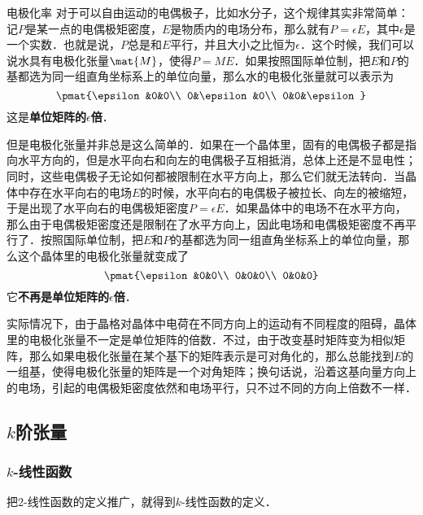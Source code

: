 \begin{example}{电极化率}
对于可以自由运动的电偶极子，比如水分子，这个规律其实非常简单：记${P}$是某一点的电偶极矩密度，${E}$是物质内的电场分布，那么就有${P}=\epsilon{E}$，其中$\epsilon$是一个实数．也就是说，${P}$总是和${E}$平行，并且大小之比恒为$\epsilon$．这个时候，我们可以说水具有电极化张量$\mat{M}$，使得${P}={M}{E}$．如果按照国际单位制，把${E}$和${P}$的基都选为同一组直角坐标系上的单位向量，那么水的电极化张量就可以表示为
\begin{equation}
\pmat{\epsilon&0&0\\ 0&\epsilon&0\\ 0&0&\epsilon}
\end{equation}
这是\textbf{单位矩阵的$\epsilon$倍}．

但是电极化张量并非总是这么简单的．如果在一个晶体里，固有的电偶极子都是指向水平方向的，但是水平向右和向左的电偶极子互相抵消，总体上还是不显电性；同时，这些电偶极子无论如何都被限制在水平方向上，那么它们就无法转向．当晶体中存在水平向右的电场${E}$的时候，水平向右的电偶极子被拉长、向左的被缩短，于是出现了水平向右的电偶极矩密度${P}=\epsilon{E}$．如果晶体中的电场不在水平方向，那么由于电偶极矩密度还是限制在了水平方向上，因此电场和电偶极矩密度不再平行了．按照国际单位制，把${E}$和${P}$的基都选为同一组直角坐标系上的单位向量，那么这个晶体里的电极化张量就变成了
\begin{equation}
\pmat{\epsilon&0&0\\ 0&0&0\\ 0&0&0}
\end{equation}
它\textbf{不再是单位矩阵的$\epsilon$倍}．

实际情况下，由于晶格对晶体中电荷在不同方向上的运动有不同程度的阻碍，晶体里的电极化张量不一定是单位矩阵的倍数．不过，由于改变基时矩阵变为相似矩阵，那么如果电极化张量在某个基下的矩阵表示是可对角化的，那么总能找到${E}$的一组基，使得电极化张量的矩阵是一个对角矩阵；换句话说，沿着这基向量方向上的电场，引起的电偶极矩密度依然和电场平行，只不过不同的方向上倍数不一样．

\end{example}


\subsection{$k$阶张量}

\subsubsection{$k$-线性函数}

把$2$-线性函数的定义推广，就得到$k$-线性函数的定义．

